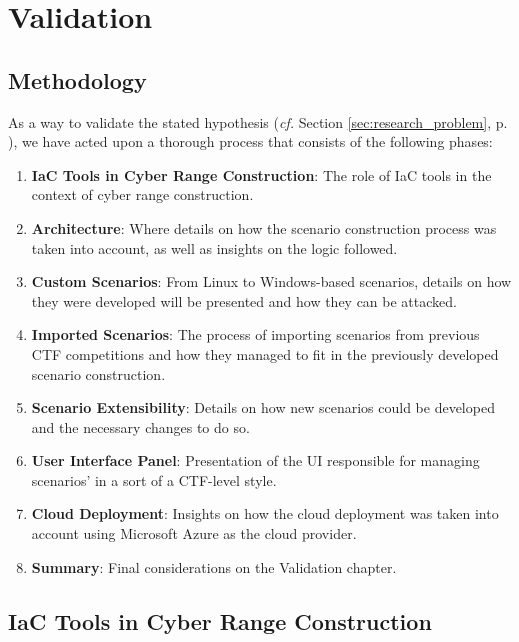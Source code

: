 \chapter{Validation}\label{chap:validation}

\minitoc

\section{Methodology} \label{sec:validation_methodology}

As a way to validate the stated hypothesis (\textit{cf.} Section \ref{sec:research_problem}, p. \pageref{sec:research_problem}), we have acted upon a thorough process that consists of the following phases:

\begin{enumerate}
    \item \textbf{IaC Tools in Cyber Range Construction}: The role of IaC tools in the context of cyber range construction. %
    \item \textbf{Architecture}: Where details on how the scenario construction process was taken into account, as well as insights on the logic followed.%
    \item \textbf{Custom Scenarios}: From Linux to Windows-based scenarios, details on how they were developed will be presented and how they can be attacked.
    \item \textbf{Imported Scenarios}: The process of importing scenarios from previous CTF competitions and how they managed to fit in the previously developed scenario construction.
    \item \textbf{Scenario Extensibility}: Details on how new scenarios could be developed and the necessary changes to do so.
    \item \textbf{User Interface Panel}: Presentation of the UI responsible for managing scenarios' in a sort of a CTF-level style.
    \item \textbf{Cloud Deployment}: Insights on how the cloud deployment was taken into account using Microsoft Azure as the cloud provider.
    \item \textbf{Summary}: Final considerations on the Validation chapter.
\end{enumerate}


\section{IaC Tools in Cyber Range Construction} \label{sec:validation_iac_tools_in_cr_construction}

